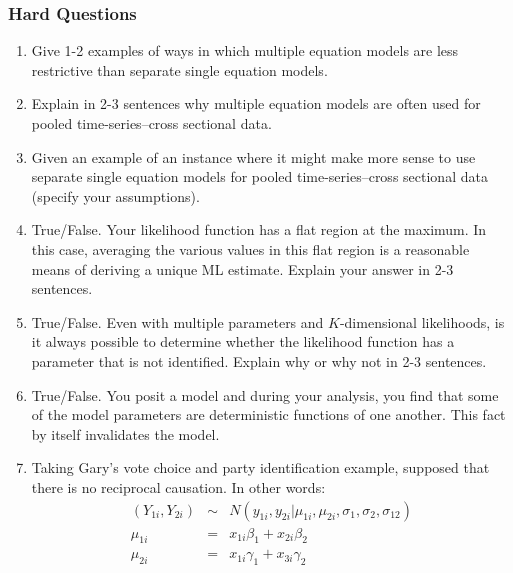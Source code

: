 \documentclass[11pt]{article}
\begin{document}
\subsubsection{Hard Questions}
\begin{enumerate}
\item Give 1-2 examples of ways in which multiple equation models are less restrictive than separate single equation models. %
\item Explain in 2-3 sentences why multiple equation models are often used for pooled time-series--cross sectional data. %
\item Given an example of an instance where it might make more sense to use separate single equation models for pooled time-series--cross sectional data (specify your assumptions).
\item True/False. Your likelihood function has a flat region at the maximum. In this case, averaging the various values in this flat region is a reasonable means of deriving a unique ML estimate. Explain your answer in 2-3 sentences. %
\item True/False. Even with multiple parameters and $K$-dimensional likelihoods, is it always possible to determine whether the likelihood function has a parameter that is not identified. Explain why or why not in 2-3 sentences. %
\item True/False. You posit a model and during your analysis, you find that some of the model parameters are deterministic functions of one another. This fact by itself invalidates the model. %
\item Taking Gary's vote choice and party identification example, supposed that there is no reciprocal causation. In other words:
\begin{eqnarray*}
(Y_{1i},Y_{2i}) &\sim& N(y_{1i},y_{2i}|\mu_{1i},\mu_{2i},\sigma_{1},\sigma_{2},\sigma_{12})\\
\mu_{1i} &=& x_{1i}\beta_1 + x_{2i}\beta_2 \\
\mu_{2i} &=& x_{1i}\gamma_1 + x_{3i}\gamma_2

\end{eqnarray*}
\end{enumerate}
\end{document}
